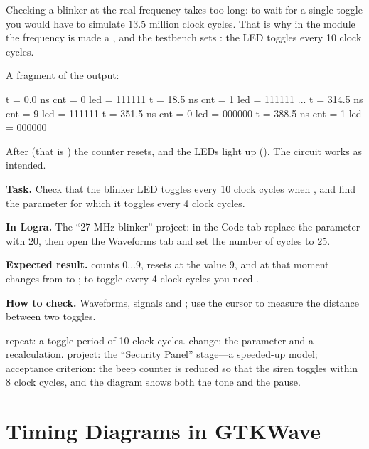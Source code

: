 Checking a blinker at the real frequency takes too long: to wait for a single
toggle you would have to simulate $13.5$ million clock cycles. That is why in the
 module the frequency is made a , and the testbench sets
: the LED toggles every 10 clock cycles.


A fragment of the output:
\begin{vcode}[text]
t =    0.0 ns  cnt =  0  led = 111111
t =   18.5 ns  cnt =  1  led = 111111
...
t =  314.5 ns  cnt =  9  led = 111111
t =  351.5 ns  cnt =  0  led = 000000
t =  388.5 ns  cnt =  1  led = 000000
\end{vcode}

After  (that is ) the counter resets, and the
LEDs light up (). The circuit works as intended.

\begin{diybox}
\textbf{Task.} Check that the blinker LED toggles every 10 clock cycles when , and find the parameter for which it toggles every 4 clock cycles.

\textbf{In Logra.} The ``27 MHz blinker'' project: in the Code tab replace the  parameter with 20, then open the Waveforms tab and set the number of cycles to 25.

\textbf{Expected result.}  counts $0\ldots9$, resets at the value 9, and at that moment  changes from  to ; to toggle every 4 clock cycles you need .

\textbf{How to check.} Waveforms, signals  and ; use the cursor to measure the distance between two toggles.

 repeat: a toggle period of 10 clock cycles.  change: the parameter  and a recalculation.  project: the ``Security Panel'' stage---a speeded-up model; acceptance criterion: the beep counter is reduced so that the siren toggles within 8 clock cycles, and the diagram shows both the tone and the pause.
\end{diybox}

\section{Timing Diagrams in GTKWave}

